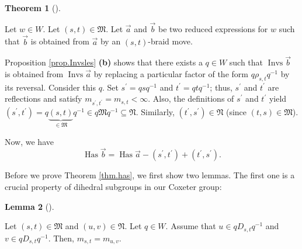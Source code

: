 \documentclass
[numbers=enddot,12pt,final,onecolumn,notitlepage,abstracton]{scrartcl}%
\theoremstyle{definition}
\newtheorem{theo}{Theorem}[section]
\newenvironment{theorem}[1][]
{\begin{theo}[#1]\begin{leftbar}}
{\end{leftbar}\end{theo}}
\newtheorem{lem}[theo]{Lemma}
\newenvironment{lemma}[1][]
{\begin{lem}[#1]\begin{leftbar}}
{\end{leftbar}\end{lem}}
\begin{document}
\begin{theorem}
\label{thm.has}Let $w\in W$. Let $\left(  s,t\right)  \in\mathfrak{M}$. Let
$\overrightarrow{a}$ and $\overrightarrow{b}$ be two reduced expressions for
$w$ such that $\overrightarrow{b}$ is obtained from $\overrightarrow{a}$ by an
$\left(  s,t\right)  $-braid move.

Proposition \ref{prop.Invsles} \textbf{(b)} shows that there exists a $q\in W$
such that $\operatorname*{Invs}\overrightarrow{b}$ is obtained from
$\operatorname*{Invs}\overrightarrow{a}$ by replacing a particular factor of
the form $q\rho_{s,t}q^{-1}$ by its reversal. Consider this $q$. Set
$s^{\prime}=qsq^{-1}$ and $t^{\prime}=qtq^{-1}$; thus, $s^{\prime}$ and
$t^{\prime}$ are reflections and satisfy $m_{s^{\prime},t^{\prime}}%
=m_{s,t}<\infty$. Also, the definitions of $s^{\prime}$ and $t^{\prime}$ yield
$\left(  s^{\prime},t^{\prime}\right)  =q\underbrace{\left(  s,t\right)
}_{\in\mathfrak{M}}q^{-1}\in q\mathfrak{M}q^{-1}\subseteq\mathfrak{N}$.
Similarly, $\left(  t^{\prime},s^{\prime}\right)  \in\mathfrak{N}$ (since
$\left(  t,s\right)  \in\mathfrak{M}$).

Now, we have%
\begin{equation}
\operatorname*{Has}\overrightarrow{b}=\operatorname*{Has}\overrightarrow{a}%
-\left(  s^{\prime},t^{\prime}\right)  +\left(  t^{\prime},s^{\prime}\right)
. \label{eq.thm.has.a}%
\end{equation}

\end{theorem}

Before we prove Theorem \ref{thm.has}, we first show two lemmas. The first one
is a crucial property of dihedral subgroups in our Coxeter group:

\begin{lemma}
\label{lem.dihindih}Let $\left(  s,t\right)  \in\mathfrak{M}$ and $\left(
u,v\right)  \in\mathfrak{N}$. Let $q\in W$. Assume that $u\in qD_{s,t}q^{-1}$
and $v\in qD_{s,t}q^{-1}$. Then, $m_{s,t}=m_{u,v}$.
\end{lemma}
\end{document}

